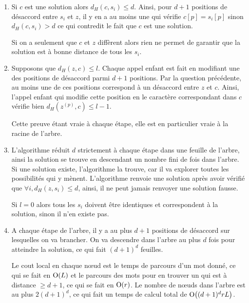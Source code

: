 \begin{td-sol}
    \begin{enumerate}
        \item Si \(c\) est une solution alors \(d_H(c, s_i) \leq d\). 
        Ainsi, pour \(d+1\) positions de désaccord entre \(s_i\) et \(z\), il y en a au moins une qui vérifie \(c[p] = s_i[p]\) sinon \(d_H(c, s_i) > d\) ce qui contredit le fait que \(c\) est une solution.

        Si on a seulement que \(c\) et \(z\) diffèrent alors rien ne permet de garantir que la solution est à bonne distance de tous les \(s_i\).

        \item Supposons que \(d_H(z, c) \leq l\).
        Chaque appel enfant est fait en modifiant une des positions de désaccord parmi \(d+1\) positions.
        Par la question précédente, au moins une de ces positions correspond à un désaccord entre \(z\) et \(c\). 
        Ainsi, l'appel enfant qui modifie cette position en le caractère correspondant dans \(c\) vérifie bien \(d_H(z^{(p)}, c) \leq l-1\).

        Cette preuve étant vraie à chaque étape, elle est en particulier vraie à la racine de l'arbre.

        \item L'algorithme réduit \(d\) strictement à chaque étape dans une feuille de l'arbre, ainsi la solution se trouve en descendant un nombre fini de fois dans l'arbre.
        Si une solution existe, l'algorithme la trouve, car il va explorer toutes les possibilités qui y mènent.
        L'algorithme renvoie une solution après avoir vérifié que \(\forall i, d_H(z, s_i) \leq d\), ainsi, il ne peut jamais renvoyer une solution fausse.

        Si \(l = 0\) alors tous les \(s_i\) doivent être identiques et correspondent à la solution, sinon il n'en existe pas.

        \item A chaque étape de l'arbre, il y a au plus \(d+1\) positions de désaccord sur lesquelles on va brancher.
        On va descendre dans l'arbre au plus \(d\) fois pour atteindre la solution, ce qui fait \({(d+1)}^d\) feuilles.

        Le cout local en chaque nœud est le temps de parcours d'un mot donné, ce qui se fait en \(\BigO{L}\) et le parcours des mots pour en trouver un qui est à distance \(\geq d+1\), ce qui se fait en \(\BigO{r}\).
        Le nombre de nœuds dans l'arbre est au plus \(2{(d+1)}^d\), ce qui fait un temps de calcul total de \(\BigO{(d+1)^d r L}\).
    \end{enumerate}
\end{td-sol}


